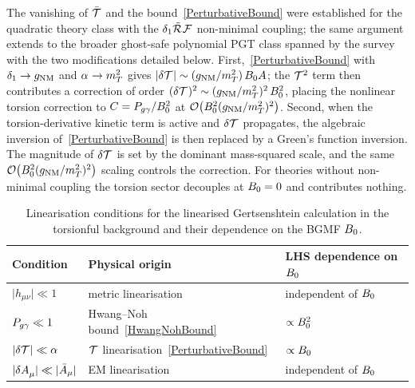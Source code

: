 The vanishing of $\bar{\MAGT{}}$ and the bound~\cref{PerturbativeBound} were established for the
quadratic theory class with the $\Del{1}\MAGFt{}\FieldF{}$
non-minimal coupling; the same argument extends to the broader
ghost-safe polynomial PGT class spanned by the
survey~\cite{blagojevic2018hamiltonian} with the two modifications
detailed below.
First,~\cref{PerturbativeBound} with $\delta_{1}\to g_{\mathrm{NM}}$ and
$\alpha_{}\to m_T^2$ gives
$|\delta\MAGT{}|\sim(g_{\mathrm{NM}}/m_T^2)\,\Bzero A$;
the $\MAGT{^2}$ term then contributes a
correction of order
$(\delta\MAGT{})^2 \sim (g_{\mathrm{NM}}/m_T^2)^2\,\Bzero^2$,
placing the nonlinear torsion correction to $C=P_{g\gamma}/B_0^2$ at
$\mathcal{O}\!\left(B_0^2(g_{\mathrm{NM}}/m_T^2)^2\right)$.
Second, when the torsion-derivative kinetic term is active and
$\delta\MAGT{}$ propagates,
the algebraic inversion of~\cref{PerturbativeBound} is then replaced
by a Green's function inversion.
The magnitude of $\delta\MAGT{}$ is set by the dominant mass-squared
scale, and the same
$\mathcal{O}\!\left(B_0^2(g_{\mathrm{NM}}/m_T^2)^2\right)$ scaling
controls the correction.
For theories without non-minimal coupling the torsion sector
decouples at $B_0=0$ and contributes nothing.

\begin{table}[htbp]
  \centering
  \caption{Linearisation conditions for the linearised Gertsenshtein
    calculation in the torsionful background and their dependence
    on the BGMF $B_0$.}
  \label{PerturbativityHierarchy}
  \begin{tabular}{@{}lll@{}}
    \toprule
    Condition & Physical origin & LHS dependence on $B_0$ \\
    \midrule
    $\lvert h_{\mu\nu}\rvert \ll 1$
      & metric linearisation
      & independent of $B_0$ \\
    $P_{g\gamma} \ll 1$
      & Hwang--Noh bound~\cref{HwangNohBound}
      & $\propto B_0^2$ \\
    $\lvert\delta\MAGT{}\rvert \ll \Alp{}$
      & $\MAGT{}$ linearisation~\cref{PerturbativeBound}
      & $\propto B_0$ \\
    $\lvert\delta\FieldA{_\mu}\rvert \ll \lvert\bar{A}_\mu\rvert$
      & EM linearisation
      & independent of $B_0$ \\
    \bottomrule
  \end{tabular}
\end{table}

